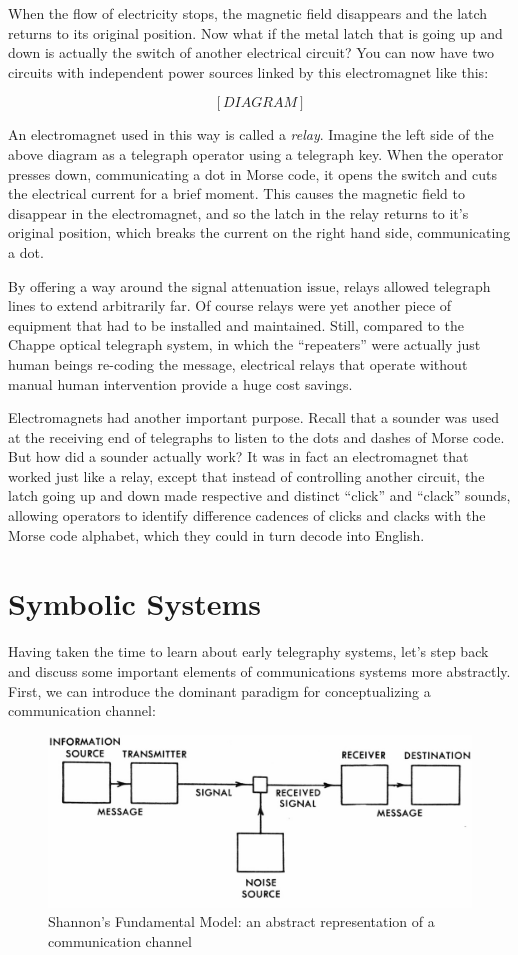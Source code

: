 \documentclass[UTF8]{book}
\begin{document}
\begin{CJK}{UTF8}{gbsn}
When the flow of electricity stops, the magnetic field disappears and the latch returns to its original position. Now what if the metal latch that is going up and down is actually the switch of another electrical circuit? You can now have two circuits with independent power sources linked by this electromagnet like this:

\[ [DIAGRAM] \]

An electromagnet used in this way is called a \emph{relay}. Imagine the left side of the above diagram as a telegraph operator using a telegraph key. When the operator presses down, communicating a dot in Morse code, it opens the switch and cuts the electrical current for a brief moment. This causes the magnetic field to disappear in the electromagnet, and so the latch in the relay returns to it's original position, which breaks the current on the right hand side, communicating a dot.

By offering a way around the signal attenuation issue, relays allowed telegraph lines to extend arbitrarily far. Of course relays were yet another piece of equipment that had to be installed and maintained. Still, compared to the Chappe optical telegraph system, in which the ``repeaters'' were actually just human beings re-coding the message, electrical relays that operate without manual human intervention provide a huge cost savings.

Electromagnets had another important purpose. Recall that a sounder was used at the receiving end of telegraphs to listen to the dots and dashes of Morse code. But how did a sounder actually work? It was in fact an electromagnet that worked just like a relay, except that instead of controlling another circuit, the latch going up and down made respective and distinct ``click'' and ``clack'' sounds, allowing operators to identify difference cadences of clicks and clacks with the Morse code alphabet, which they could in turn decode into English.

\chapter{Symbolic Systems}

Having taken the time to learn about early telegraphy systems, let's step back and discuss some important elements of communications systems more abstractly. First, we can introduce the dominant paradigm for conceptualizing a communication channel:

\begin{figure}[H]
\centering
\includegraphics[width=0.8\linewidth]{shannon_comm_channel}
\caption{Shannon's Fundamental Model: an abstract representation of a communication channel}
\end{figure}


\end{CJK}
\end{document}

